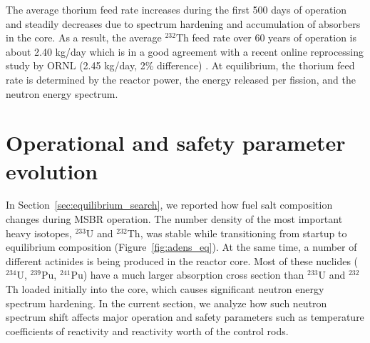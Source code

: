 The average thorium feed rate increases during the first 500 days of operation 
and steadily decreases due to spectrum hardening and accumulation of absorbers 
in the core. As a result, the average $^{232}$Th feed rate over 60 years of 
operation is about 2.40 kg/day which is in a good agreement with a recent 
online reprocessing study by \gls{ORNL} (2.45 kg/day, 2\% difference) 
\cite{betzler_molten_2017, betzler_personal_2017}. At equilibrium, the thorium 
feed rate is determined by the reactor power, the energy released per fission, 
and the neutron energy spectrum.


\section{Operational and safety parameter evolution}
In Section~\ref{sec:equilibrium_search}, we reported how fuel salt composition 
changes during \gls{MSBR} operation. The number density of the most 
important heavy isotopes, $^{233}$U and $^{232}$Th, was stable while 
transitioning from startup to equilibrium composition  
(Figure~\ref{fig:adens_eq}). At the same time, a number of different 
actinides is being produced in the reactor core. Most of these nuclides 
($^{234}$U, $^{239}$Pu, $^{241}$Pu) have a much larger absorption cross 
section than $^{233}$U and $^{232}$Th loaded initially into the core, which 
causes significant neutron energy spectrum hardening. In the current section, 
we analyze how such neutron spectrum shift affects major operation and safety 
parameters such as temperature coefficients of reactivity and reactivity worth 
of the control rods. 


